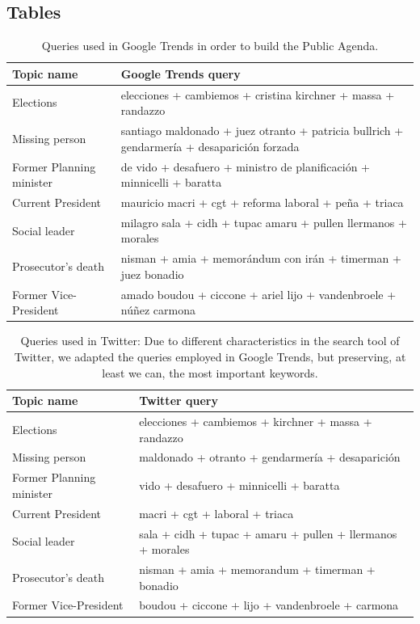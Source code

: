 \documentclass{bmcart}
\begin{document}
\begin{backmatter}
\section*{Tables}

\begin{table}[h!]
\caption{Queries used in Google Trends in order to build the Public Agenda.}
\begin{tabular}{l|p{7.5cm}}
Topic name & Google Trends query \\ \hline
Elections & elecciones + cambiemos + cristina kirchner + massa + randazzo \\
Missing person & santiago maldonado + juez otranto + patricia bullrich + gendarmería + desaparici\'on forzada \\
Former Planning minister & de vido + desafuero + ministro de planificaci\'on + minnicelli + baratta \\
Current President & mauricio macri + cgt + reforma laboral + peña + triaca \\
Social leader & milagro sala + cidh + tupac amaru + pullen llermanos + morales \\
Prosecutor's death & nisman + amia + memor\'andum con ir\'an + timerman + juez bonadio \\
Former Vice-President & amado boudou + ciccone + ariel lijo + vandenbroele + núñez carmona \\
\end{tabular}
\label{table:gt_queries}
\end{table}

\begin{table}[h!]
\caption{Queries used in Twitter: Due to different characteristics in the search tool of Twitter, we adapted the queries employed in Google Trends, but preserving, at least we can, the most important keywords.}
\begin{tabular}{l|p{7.5cm}}
Topic name & Twitter query \\ \hline
Elections & elecciones + cambiemos + kirchner + massa + randazzo \\
Missing person & maldonado + otranto + gendarmer\'ia + desaparici\'on \\
Former Planning minister & vido + desafuero + minnicelli + baratta \\
Current President & macri + cgt + laboral +  triaca \\
Social leader &  sala + cidh + tupac + amaru + pullen + llermanos + morales \\
Prosecutor’s death & nisman + amia + memorandum + timerman +  bonadio \\
Former Vice-President & boudou + ciccone +  lijo + vandenbroele + carmona \\ 
\end{tabular}
\label{table:tw_queries}
\end{table}



\end{backmatter}
\end{document}
